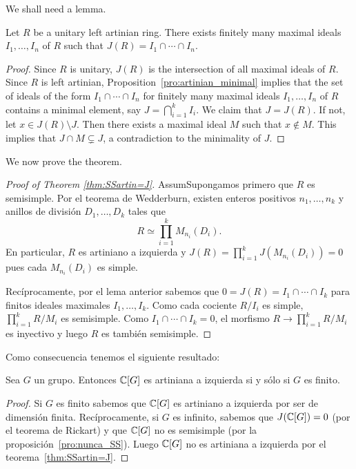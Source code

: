 We shall need a lemma.

\begin{lemma}
	\label{lem:Jartiniano}
	Let $R$ be a unitary left artinian ring. There exists finitely many maximal ideals 
	$I_1,\dots,I_n$ of $R$ such that 
	$J(R)=I_1\cap\cdots\cap I_n$.
\end{lemma}

\begin{proof}
	Since $R$ is
	unitary, $J(R)$ is the intersection of all maximal ideals of $R$. Since $R$ is left artinian,
	Proposition~\ref{pro:artinian_minimal} implies that 
	the set of ideals of the form
	$I_1\cap\cdots\cap I_n$ for finitely many maximal ideals $I_1,\dots,I_n$ of $R$ 
	contains a minimal element, say 
	$J=\bigcap_{i=1}^k I_i$. We claim that $J=J(R)$. If not, let $x\in
	J(R)\setminus J$. Then there exists a maximal ideal $M$ such that $x\not\in
	M$. This implies that $J\cap M\subsetneq J$, a contradiction to the minimality of 
    $J$. 
\end{proof}

We now prove the theorem. 

\begin{proof}[Proof of Theorem \ref{thm:SSartin=J}]
	AssumSupongamos primero que $R$ es semisimple. Por el teorema de Wedderburn,
	existen enteros positivos $n_1,\dots,n_k$ y anillos de división
	$D_1,\dots,D_k$ tales que \[
		R\simeq\prod_{i=1}^kM_{n_i}(D_i).
	\]
	En particular, $R$ es
	artiniano a izquierda y $J(R)=\prod_{i=1}^kJ(M_{n_i}(D_i))=0$ pues
	cada $M_{n_i}(D_i)$ es simple. 

	Recíprocamente, por el lema anterior sabemos que $0=J(R)=I_1\cap\cdots\cap I_k$ para
	finitos ideales maximales $I_1,\dots,I_k$.  Como cada cociente $R/I_i$ es
	simple, $\prod_{i=1}^k R/M_i$ es semisimple. Como $I_1\cap\cdots\cap I_k=0$,
	el morfismo $R\to \prod_{i=1}^k R/M_i$ es inyectivo y luego $R$ es también
	semisimple.
\end{proof}

Como consecuencia tenemos el siguiente resultado:

\begin{proposition}
	Sea $G$ un grupo. Entonces $\mathbb{C}[G]$ es artiniana a izquierda si y sólo si
	$G$ es finito. 
\end{proposition}

\begin{proof}
	Si $G$ es finito sabemos que $\mathbb{C}[G]$ es artiniano a izquierda por ser de
	dimensión finita.  Recíprocamente, si $G$ es infinito, sabemos que
	$J(\mathbb{C}[G])=0$ (por el teorema de Rickart) y que $\mathbb{C}[G]$ no es semisimple
	(por la proposición~\ref{pro:nunca_SS}). Luego $\mathbb{C}[G]$ no es artiniana a izquierda por el
	teorema~\ref{thm:SSartin=J}.
\end{proof}

